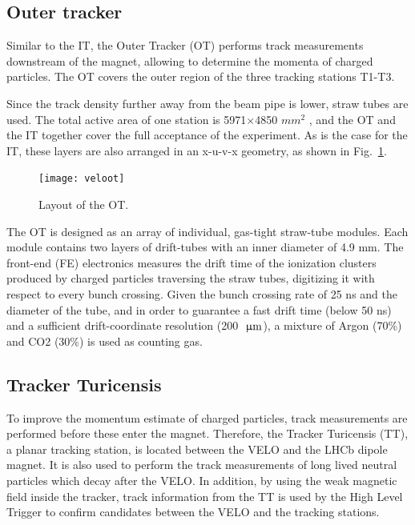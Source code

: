 \subsection{Outer tracker}

Similar to the IT, the Outer Tracker (OT) performs track measurements downstream of
the magnet, allowing to determine the momenta of charged particles. The OT covers the
outer region of the three tracking stations T1-T3.

Since the track density further away from the beam pipe is lower, straw tubes are used.
The total active area of one station is 5971$\times$4850 $mm^2$ , and the OT and the IT together
cover the full acceptance of the experiment. As is the case for the IT, these layers are also
arranged in an x-u-v-x geometry, as shown in Fig.~\ref{fig:veloot}.

\begin{figure}[tb]
\begin{center}
\texttt{[image: veloot]}
\end{center}
\caption{\small Layout of the OT.}
\label{fig:veloot}
\end{figure}

The OT is designed as an array of individual, gas-tight straw-tube modules.
Each module contains two layers of drift-tubes with an inner diameter of 4.9 mm. 
The front-end (FE) electronics measures the drift time of the ionization clusters
produced by charged particles traversing the straw tubes, digitizing it with respect to every
bunch crossing. Given the bunch crossing rate of 25 ns and the diameter of the tube, and in
order to guarantee a fast drift time (below 50 ns) and a sufficient drift-coordinate resolution
(200~$\,\upmu\rm m$), a mixture of Argon (70\%) and CO2 (30\%) is used as counting gas.

\subsection{Tracker Turicensis}

To improve the momentum estimate of charged particles, track measurements are performed
before these enter the magnet. Therefore, the Tracker Turicensis (TT), a planar tracking
station, is located between the VELO and the LHCb dipole magnet. It is also used to
perform the track measurements of long lived neutral particles which decay after the VELO.
In addition, by using the weak magnetic field inside the tracker,
track information from the TT is used by the High Level Trigger to confirm candidates
between the VELO and the tracking stations.

